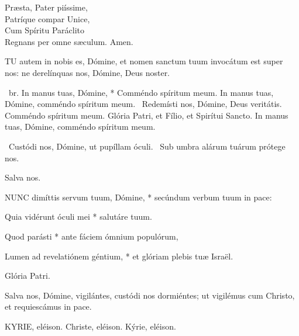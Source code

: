 Præsta, Pater piíssime,\\
Patríque compar Unice,\\
Cum Spíritu Paráclito\\
Regnans per omne sæculum. Amen.



\lettrine[lines=2]{T}{U} autem in nobis es, Dómine, et nomen sanctum tuum invocátum est super nos: ne derelínquas nos, Dómine, Deus noster.

\R\ br. In manus tuas, Dómine, * Comméndo spíritum meum. In manus tuas, Dómine, comméndo spíritum meum. \V\ Redemísti nos, Dómine, Deus veritátis. Comméndo spíritum meum. Glória Patri, et Fílio, et Spirítui Sancto. In manus tuas, Dómine, comméndo spíritum meum.

\V\ Custódi nos, Dómine, ut pupíllam óculi. \R\ Sub umbra alárum tuárum prótege nos.


 Salva nos.


\lettrine[lines=2]{N}{UNC} dimíttis servum tuum, Dómine, * secúndum verbum tuum in pace:

Quia vidérunt óculi mei * salutáre tuum.

Quod parásti * ante fáciem ómnium populórum,

Lumen ad revelatiónem géntium, * et glóriam plebis tuæ Israël.

Glória Patri.

 Salva nos, Dómine, vigilántes, custódi nos dormiéntes; ut vigilémus cum Christo, et requiescámus in pace.



KYRIE, eléison. Christe, eléison. Kýrie, eléison.

